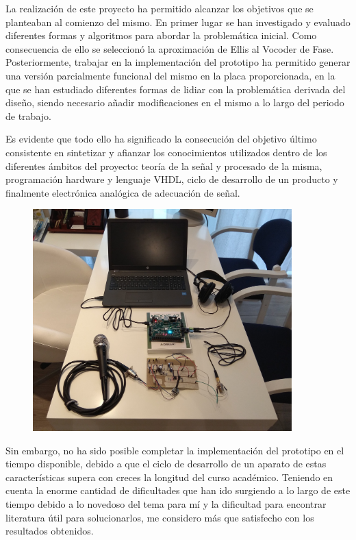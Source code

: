 La realización de este proyecto ha permitido alcanzar los objetivos que se planteaban al comienzo del mismo. En primer lugar se han investigado y evaluado diferentes formas y algoritmos para abordar la problemática inicial. Como consecuencia de ello se seleccionó la aproximación de Ellis al Vocoder de Fase. Posteriormente, trabajar en la implementación del prototipo ha permitido generar una versión parcialmente funcional del mismo en la placa proporcionada, en la que se han estudiado diferentes formas de lidiar con la problemática derivada del diseño, siendo necesario añadir modificaciones en el mismo a lo largo del periodo de trabajo. 

Es evidente que todo ello ha significado la consecución del objetivo último consistente en sintetizar y afianzar los conocimientos utilizados dentro de los diferentes ámbitos del proyecto: teoría de la señal y procesado de la misma, programación hardware y lenguaje VHDL, ciclo de desarrollo de un producto y finalmente electrónica analógica de adecuación de señal.

\begin{figure}[!b]
\begin{center}
\includegraphics[width=10cm]{img/final.jpg}
\end{center}
\end{figure}

Sin embargo, no ha sido posible completar la implementación del prototipo en el tiempo disponible, debido a que el ciclo de desarrollo de un aparato de estas características supera con creces la longitud del curso académico. Teniendo en cuenta la enorme cantidad de dificultades que han ido surgiendo a lo largo de este tiempo debido a lo novedoso del tema para mí y la dificultad para encontrar literatura útil para solucionarlos, me considero más que satisfecho con los resultados obtenidos.

